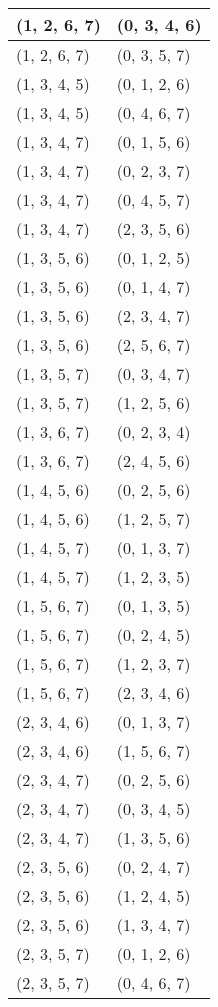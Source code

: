 \begin{footnotesize}
\begin{longtable}[c]{|l|l|}
(1, 2, 6, 7)
&(0, 3, 4, 6)
\\ \hline
(1, 2, 6, 7)
&(0, 3, 5, 7)
\\ \hline
(1, 3, 4, 5)
&(0, 1, 2, 6)
\\ \hline
(1, 3, 4, 5)
&(0, 4, 6, 7)
\\ \hline
(1, 3, 4, 7)
&(0, 1, 5, 6)
\\ \hline
(1, 3, 4, 7)
&(0, 2, 3, 7)
\\ \hline
(1, 3, 4, 7)
&(0, 4, 5, 7)
\\ \hline
(1, 3, 4, 7)
&(2, 3, 5, 6)
\\ \hline
(1, 3, 5, 6)
&(0, 1, 2, 5)
\\ \hline
(1, 3, 5, 6)
&(0, 1, 4, 7)
\\ \hline
(1, 3, 5, 6)
&(2, 3, 4, 7)
\\ \hline
(1, 3, 5, 6)
&(2, 5, 6, 7)
\\ \hline
(1, 3, 5, 7)
&(0, 3, 4, 7)
\\ \hline
(1, 3, 5, 7)
&(1, 2, 5, 6)
\\ \hline
(1, 3, 6, 7)
&(0, 2, 3, 4)
\\ \hline
(1, 3, 6, 7)
&(2, 4, 5, 6)
\\ \hline
(1, 4, 5, 6)
&(0, 2, 5, 6)
\\ \hline
(1, 4, 5, 6)
&(1, 2, 5, 7)
\\ \hline
(1, 4, 5, 7)
&(0, 1, 3, 7)
\\ \hline
(1, 4, 5, 7)
&(1, 2, 3, 5)
\\ \hline
(1, 5, 6, 7)
&(0, 1, 3, 5)
\\ \hline
(1, 5, 6, 7)
&(0, 2, 4, 5)
\\ \hline
(1, 5, 6, 7)
&(1, 2, 3, 7)
\\ \hline
(1, 5, 6, 7)
&(2, 3, 4, 6)
\\ \hline
(2, 3, 4, 6)
&(0, 1, 3, 7)
\\ \hline
(2, 3, 4, 6)
&(1, 5, 6, 7)
\\ \hline
(2, 3, 4, 7)
&(0, 2, 5, 6)
\\ \hline
(2, 3, 4, 7)
&(0, 3, 4, 5)
\\ \hline
(2, 3, 4, 7)
&(1, 3, 5, 6)
\\ \hline
(2, 3, 5, 6)
&(0, 2, 4, 7)
\\ \hline
(2, 3, 5, 6)
&(1, 2, 4, 5)
\\ \hline
(2, 3, 5, 6)
&(1, 3, 4, 7)
\\ \hline
(2, 3, 5, 7)
&(0, 1, 2, 6)
\\ \hline
(2, 3, 5, 7)
&(0, 4, 6, 7)
\\ \hline

\end{longtable}
\end{footnotesize}
